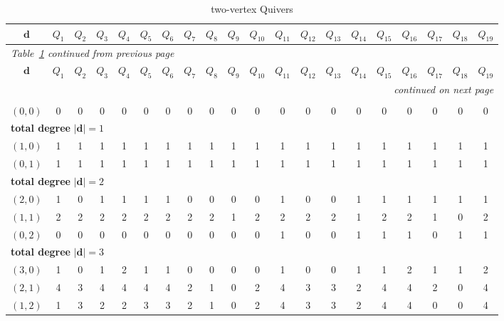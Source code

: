 \documentclass{article}
\newcommand{\bd}{\mathbf{d}}
\begin{document}
\small
\setlength{\tabcolsep}{1.5pt}
\begin{longtable}{|c|c|c|c|c|c|c|c|c|c|c|c|c|c|c|c|c|c|c|c|}
\caption{two-vertex Quivers}\label{tab:2vtx}\\
\hline
$\bd$ & $Q_{1}$ & $Q_{2}$ & $Q_{3}$ & $Q_{4}$ & $Q_{5}$ & $Q_{6}$ & $Q_{7}$ & $Q_{8}$ & $Q_{9}$ & $Q_{10}$ & $Q_{11}$ & $Q_{12}$ & $Q_{13}$ & $Q_{14}$ & $Q_{15}$ & $Q_{16}$ & $Q_{17}$ & $Q_{18}$ & $Q_{19}$ \\ \hline\hline
\endfirsthead
\multicolumn{20}{l}{\small\itshape Table~\ref{tab:2vtx} continued from previous page} \\ \hline
$\bd$ & $Q_{1}$ & $Q_{2}$ & $Q_{3}$ & $Q_{4}$ & $Q_{5}$ & $Q_{6}$ & $Q_{7}$ & $Q_{8}$ & $Q_{9}$ & $Q_{10}$ & $Q_{11}$ & $Q_{12}$ & $Q_{13}$ & $Q_{14}$ & $Q_{15}$ & $Q_{16}$ & $Q_{17}$ & $Q_{18}$ & $Q_{19}$ \\ \hline\hline
\endhead
\hline \multicolumn{20}{r}{\small\itshape continued on next page} \\
\endfoot
\hline
\endlastfoot
\multicolumn{20}{|l|}{\textbf{total degree }$|\bd|=0$} \\ \hline
$(0,0)$ & 0 & 0 & 0 & 0 & 0 & 0 & 0 & 0 & 0 & 0 & 0 & 0 & 0 & 0 & 0 & 0 & 0 & 0 & 0 \\ \hline
\multicolumn{20}{|l|}{\textbf{total degree }$|\bd|=1$} \\ \hline
$(1,0)$ & 1 & 1 & 1 & 1 & 1 & 1 & 1 & 1 & 1 & 1 & 1 & 1 & 1 & 1 & 1 & 1 & 1 & 1 & 1 \\ \hline
$(0,1)$ & 1 & 1 & 1 & 1 & 1 & 1 & 1 & 1 & 1 & 1 & 1 & 1 & 1 & 1 & 1 & 1 & 1 & 1 & 1 \\ \hline
\multicolumn{20}{|l|}{\textbf{total degree }$|\bd|=2$} \\ \hline
$(2,0)$ & 1 & 0 & 1 & 1 & 1 & 1 & 0 & 0 & 0 & 0 & 1 & 0 & 0 & 1 & 1 & 1 & 1 & 1 & 1 \\ \hline
$(1,1)$ & 2 & 2 & 2 & 2 & 2 & 2 & 2 & 2 & 1 & 2 & 2 & 2 & 2 & 1 & 2 & 2 & 1 & 0 & 2 \\ \hline
$(0,2)$ & 0 & 0 & 0 & 0 & 0 & 0 & 0 & 0 & 0 & 0 & 1 & 0 & 0 & 1 & 1 & 1 & 0 & 1 & 1 \\ \hline
\multicolumn{20}{|l|}{\textbf{total degree }$|\bd|=3$} \\ \hline
$(3,0)$ & 1 & 0 & 1 & 2 & 1 & 1 & 0 & 0 & 0 & 0 & 1 & 0 & 0 & 1 & 1 & 2 & 1 & 1 & 2 \\ \hline
$(2,1)$ & 4 & 3 & 4 & 4 & 4 & 4 & 2 & 1 & 0 & 2 & 4 & 3 & 3 & 2 & 4 & 4 & 2 & 0 & 4 \\ \hline
$(1,2)$ & 1 & 3 & 2 & 2 & 3 & 3 & 2 & 1 & 0 & 2 & 4 & 3 & 3 & 2 & 4 & 4 & 0 & 0 & 4 \\ \hline

\end{longtable}
\end{document}
